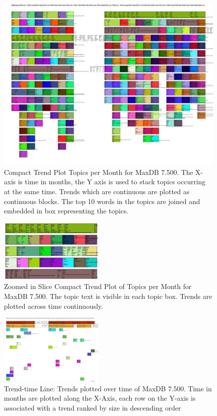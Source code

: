 \documentclass[times, 10pt,twocolumn]{article}
\begin{document}
\begin{figure}
  \centering
  \includegraphics[width=1.0\textwidth]{fixed-time-smear-plot-scaled}
  \caption{Compact Trend Plot Topics per Month for MaxDB 7.500. The
    X-axis is time in months, the Y axis is used to stack topics
    occurring at the same time. Trends which are continuous are
    plotted as continuous blocks. The top 10 words in the topics are
    joined and embedded in box representing the topics.}
  \label{fig:topicsmear}
\end{figure}


\begin{figure}
  \centering
  \includegraphics[width=0.45\textwidth]{fixed-time-smear-plot-cropped}
  \caption{Zoomed in Slice Compact Trend Plot of Topics per Month for MaxDB 7.500. The topic text is visible in each topic box. Trends are plotted across time continuously.}
  \label{fig:zoomedsmear}
\end{figure}


\begin{figure}
  \centering
  \includegraphics[width=0.45\textwidth]{class-smear-plot-crop-scaled}
  \caption{Trend-time Line: Trends plotted over time of MaxDB 7.500. Time in months are plotted along the X-Axis, each row on the Y-axis is associated with a trend ranked by size in descending order}         
  \label{fig:trendtimeline}
\end{figure}
\end{document}
